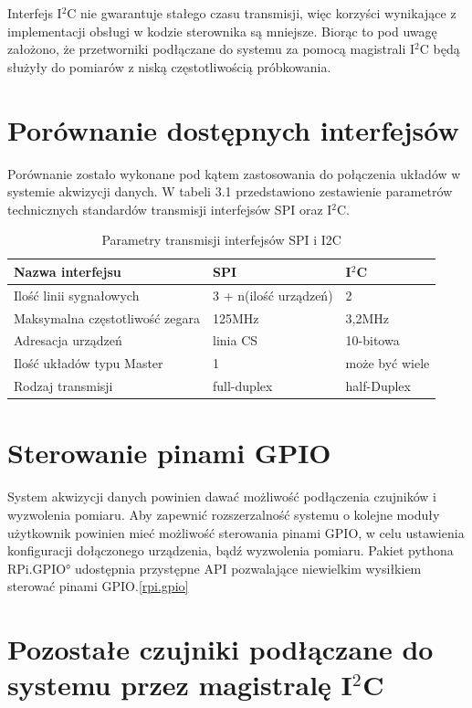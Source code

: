 Interfejs I$^2$C nie gwarantuje stałego czasu transmisji, więc korzyści wynikające z implementacji obsługi w kodzie sterownika są mniejsze. Biorąc to pod uwagę założono, że przetworniki podłączane do systemu za pomocą magistrali I$^2$C będą służyły do pomiarów z niską częstotliwością próbkowania.

\section{Porównanie dostępnych interfejsów}

Porównanie zostało wykonane pod kątem zastosowania do połączenia układów w systemie akwizycji danych. W tabeli 3.1 przedstawiono zestawienie parametrów technicznych standardów transmisji interfejsów SPI oraz I$^2$C. 


\begin{table}[!ht]
\label{tab3.2}
\begin{tabular}{|l|l|l|}
  \hline 
  Nazwa interfejsu & SPI & I$^2$C\\
  \hline
  Ilość linii sygnałowych & 3 + n(ilość urządzeń)  & 2 \\
  \hline  
  Maksymalna częstotliwość zegara & 125MHz  & 3,2MHz \\
  \hline
  Adresacja urządzeń & linia CS & 10-bitowa  \\
  \hline
  Ilość układów typu Master & 1 & może być wiele\\
  \hline
  Rodzaj transmisji & full-duplex & half-Duplex\\
  \hline
  
\end{tabular}
\caption{Parametry transmisji interfejsów SPI i I2C} 
\end{table}

\section{Sterowanie pinami GPIO}

System akwizycji danych powinien dawać możliwość podłączenia czujników i wyzwolenia pomiaru. Aby zapewnić rozszerzalność systemu o kolejne moduły użytkownik powinien mieć możliwość sterowania pinami GPIO, w celu ustawienia konfiguracji dołączonego urządzenia, bądź wyzwolenia pomiaru.
Pakiet pythona \ang{RPi.GPIO} udostępnia przystępne API pozwalające niewielkim wysiłkiem sterować pinami GPIO.\ref{rpi.gpio}

\section{Pozostałe czujniki podłączane do systemu przez magistralę I$^2$C}


